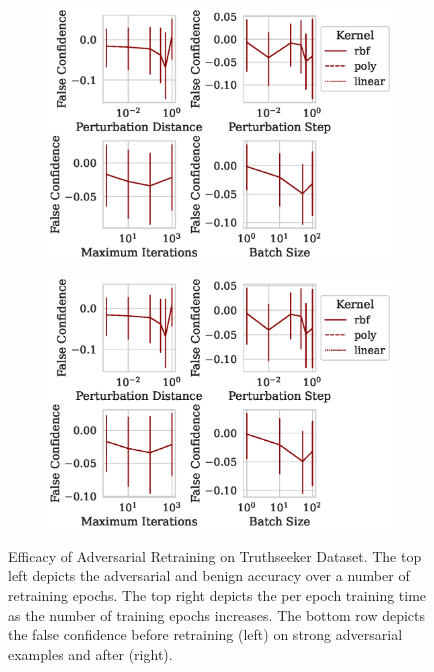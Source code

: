 \documentclass[fonts]{icst}
\begin{document}
\begin{appendices}
\begin{figure}[h!]
     \hfill
     \begin{subfigure}{0.47\textwidth}
         \centering
         \includegraphics[width=\textwidth]{./truthseeker/confidence_vs_attack_parameters.eps}
     \end{subfigure}
     \hfill
     \begin{subfigure}{0.47\textwidth}
         \centering
         \includegraphics[width=\textwidth]{./truthseeker/retrain_confidence_vs_attack_parameters.eps}
     \end{subfigure}
     \hfill
     \caption{Efficacy of Adversarial Retraining on Truthseeker Dataset. The top left depicts the adversarial and benign accuracy over a number of retraining epochs. The top right depicts the per epoch training time as the number of training epochs increases. The bottom row depicts the false confidence before retraining (left) on strong adversarial examples and after (right).}
     \label{fig:truthseeker}
\end{figure}
\end{appendices}
\end{document}

